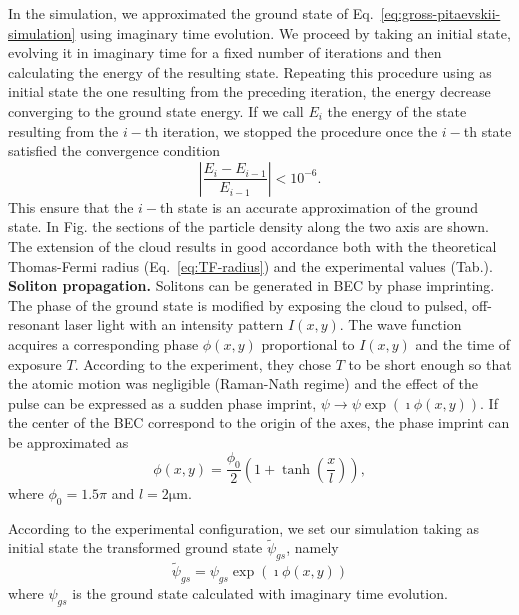 In the simulation, we approximated the ground state of Eq.~\eqref{eq:gross-pitaevskii-simulation} using imaginary time evolution. We proceed by taking an initial state, evolving it in imaginary time for a fixed number of iterations and then calculating the energy of the resulting state. Repeating this procedure using as initial state the one resulting from the preceding iteration, the energy decrease converging to the ground state energy. If we call $E_i$ the energy of the state resulting from the $i-$th iteration, we stopped the procedure once the $i-$th state satisfied the convergence condition
\begin{equation}
\left| \frac{E_{i} - E_{i-1}}{E_{i-1}} \right| < 10^{-6}.
\end{equation}
This ensure that the $i-$th state is an accurate approximation of the ground state. In Fig. %
the sections of the particle density along the two axis are shown. The extension of the cloud results in good accordance both with the theoretical Thomas-Fermi radius (Eq.~\eqref{eq:TF-radius}) and the experimental values (Tab.). %
\\

\noindent \textbf{Soliton propagation.} Solitons can be generated in BEC by phase imprinting. The phase of the ground state is modified by exposing the cloud to pulsed, off-resonant laser light with an intensity pattern $I(x,y)$. The wave function acquires a corresponding phase $\phi(x,y)$ proportional to $I(x,y)$ and the time of exposure $T$. According to the experiment, they chose $T$ to be short enough so that the atomic motion was negligible (Raman-Nath regime) and the effect of the pulse can be expressed as a sudden phase imprint, $\psi \rightarrow \psi \exp(\imath \phi(x,y))$. If the center of the BEC correspond to the origin of the axes, the phase imprint can be approximated as
\begin{equation}
\phi(x,y) = \frac{\phi_0}{2} \left(1 + \tanh\left(\frac{x}{l}\right)\right),
\end{equation}
where $\phi_0 = 1.5\pi$ and $l=2 \mathrm{\mu m}$. 

According to the experimental configuration, we set our simulation taking as initial state the transformed ground state $\tilde{\psi}_{gs}$, namely
\begin{equation}
\tilde{\psi}_{gs} = \psi_{gs} \exp(\imath \phi(x,y))
\end{equation}
where $\psi_{gs}$ is the ground state calculated with imaginary time evolution.

